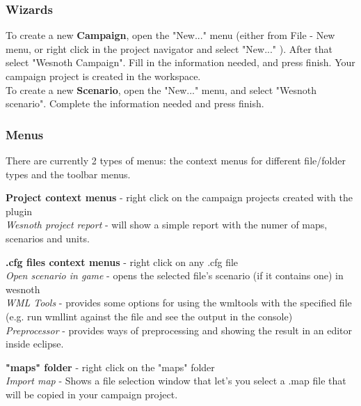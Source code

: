 \documentclass[10pt]{article}
\begin{document}
\subsubsection{Wizards}
To create a new \textbf{Campaign}, open the "New..." menu (either from File - New menu, or right click in the
project navigator and select "New..." ). After that select "Wesnoth Campaign". Fill in the information needed,
and press finish. Your campaign project is created in the workspace. \\
To create a new \textbf{Scenario}, open the "New..." menu, and select "Wesnoth scenario".
Complete the information needed and press finish.

\subsubsection{Menus}
There are currently 2 types of menus: the context menus for different file/folder types and the toolbar menus.
\begin{description}
\item{\textbf{Project context menus}} - right click on the campaign projects created with the plugin\\
   {\it Wesnoth project report} - will show a simple report with the numer of maps, scenarios and units.

\item{\textbf{.cfg files context menus}} - right click on any .cfg file\\
   {\it Open scenario in game} - opens the selected file's scenario (if it contains one) in wesnoth \\
   {\it WML Tools} - provides some options for using the wmltools with the specified file
   (e.g. run wmllint against the file and see the output in the console) \\
   {\it Preprocessor} - provides ways of preprocessing and showing the result in an editor inside eclipse.

\item{\textbf{"maps" folder}} - right click on the "maps" folder\\
   {\it Import map} - Shows a file selection window that let's you select a .map file that will be copied in your campaign project.

\end{description}
\end{document}
